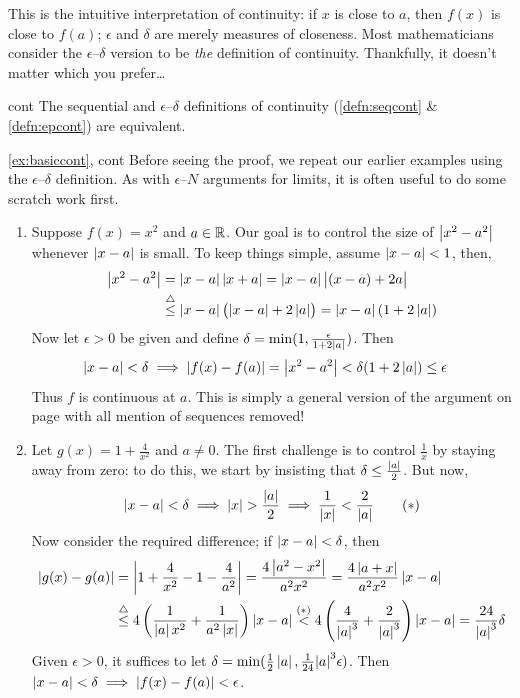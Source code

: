 This is the intuitive interpretation of continuity: if $x$ is close to $a$, then $f(x)$ is close to $f(a)$; $\epsilon$ and $\delta$ are merely measures of closeness. Most mathematicians consider the $\epsilon$--$\delta$ version to be \emph{the} definition of continuity. Thankfully, it doesn't matter which you prefer\ldots

\begin{thm}{}{cont}
	The sequential and $\epsilon$--$\delta$ definitions of continuity (\ref{defn:seqcont} \& \ref{defn:epcont}) are equivalent.
\end{thm}


\begin{examples*}{\ref{ex:basiccont}, cont}{}
	Before seeing the proof, we repeat our earlier examples using the $\epsilon$--$\delta$ definition. As with $\epsilon$--$N$ arguments for limits, it is often useful to do some scratch work first.

	\begin{enumerate}
  	\item Suppose $f(x)= x^2$ and $a\in\mathbb{R}$. Our goal is to control the size of $\left| x^2-a^2\right|$ whenever $\left| x-a\right|$ is small. To keep things simple, assume $\left| x-a\right|<1$, then,
  	\begin{align*}
  		\left| x^2-a^2\right|&=\left| x-a\right|\left| x+a\right|=\left| x-a\right|\bigl|(x-a)+2a\bigr|\\
  		&\overset{\triangle}{\le}\left| x-a\right|\bigl(\left| x-a\right|+2\left| a\right|\bigr) =\left| x-a\right|(1+2\left| a\right|)
  	\end{align*}
 		Now let $\epsilon>0$ be given and define $\delta=\min(1,\frac\epsilon{1+2\left| a\right|})$. Then
  	\begin{align*}
	  	\left| x-a\right|<\delta\implies\left| f(x)-f(a)\right|&=\left| x^2-a^2\right| <\delta(1+2\left| a\right|)\le\epsilon
  	\end{align*}
  	Thus $f$ is continuous at $a$. This is simply a general version of the argument on page \pageref{ex:easycont2} with all mention of sequences removed!
  
  	\goodbreak
  
 
  	\item Let $g(x)= 1+\frac 4{x^2}$ and $a\neq 0$. The first challenge is to control $\frac 1x$ by staying away from zero: to do this, we start by insisting that $\delta\le\frac{\left| a\right|}2$. But now,
  	\[
  		\nm{x-a}<\delta\implies \nm x>\frac{\nm a}2 \implies \frac 1{\nm x}<\frac 2{\nm a}\tag{$\ast$}
  	\]
  	Now consider the required difference; if $\left| x-a\right|<\delta$, then
	  \begin{align*}
			\left| g(x)-g(a)\right| &=\left| 1+\frac 4{x^2}-1-\frac 4{a^2}\right|=\frac{4\left| a^2-x^2\right|}{a^2x^2}=\frac{4\left| a+x\right|}{a^2x^2}\left| x-a\right|\\
	  &\overset{\triangle}{\le} 4\left(\frac 1{\left| a\right|x^2}+\frac 1{a^2\left| x\right|}\right)\left| x-a\right| \overset{(\ast)}{<} 4\left(\frac 4{\left| a\right|^3}+\frac 2{\left| a\right|^3}\right)\left| x-a\right| = \frac{24}{\left| a\right|^3}\delta
  	\end{align*}
 		Given $\epsilon>0$, it suffices to let $\delta=\min(\frac 12\left| a\right|,\frac 1{24}{\left| a\right|^3}\epsilon)$. Then $\left| x-a\right|<\delta\implies \left| f(x)-f(a)\right| <\epsilon$.
  

\end{enumerate}
\end{examples*}
